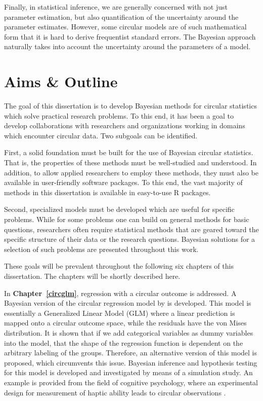 \documentclass[12pt, a4paper]{book}\usepackage[]{graphicx}\usepackage[]{color}
\let\proglang=\textsf
\begin{document}
Finally, in statistical inference, we are generally concerned with not just parameter estimation, but also quantification of the uncertainty around the parameter estimates. However, some circular models are of such mathematical form that it is hard to derive frequentist standard errors. The Bayesian approach naturally takes into account the uncertainty around the parameters of a model.

\section*{Aims \& Outline}

The goal of this dissertation is to develop Bayesian methods for circular statistics which solve practical research problems. To this end, it has been a goal to develop collaborations with researchers and organizations working in domains which encounter circular data. Two subgoals can be identified.

First, a solid foundation must be built for the use of Bayesian circular statistics. That is, the properties of these methods must be well-studied and understood. In addition, to allow applied researchers to employ these methods, they must also be available in user-friendly software packages. To this end, the vast majority of methods in this dissertation is available in easy-to-use \proglang{R} packages.

Second, specialized models must be developed which are useful for specific problems. While for some problems one can build on general methods for basic questions, researchers often require statistical methods that are geared toward the specific structure of their data or the research questions. Bayesian solutions for a selection of such problems are presented throughout this work.

These goals will be prevalent throughout the following six chapters of this dissertation. The chapters will be shortly described here.

In \textbf{Chapter~\ref{circglm}}, regression with a circular outcome is addressed. A Bayesian version of the circular regression model by \citet{fisher1992regression} is developed. This model is essentially a Generalized Linear Model (GLM) where a linear prediction is mapped onto a circular outcome space, while the residuals have the von Mises distribution. It is shown that if we add categorical variables as dummy variables into the model, that the shape of the regression function is dependent on the arbitrary labeling of the groups.
Therefore, an alternative version of this model is proposed, which circumvents this issue. Bayesian inference and hypothesis testing for this model is developed and investigated by means of a simulation study. An example is provided from the field of cognitive psychology, where an experimental design for measurement of haptic ability leads to circular observations \citep{van2013superior}.
\end{document}
